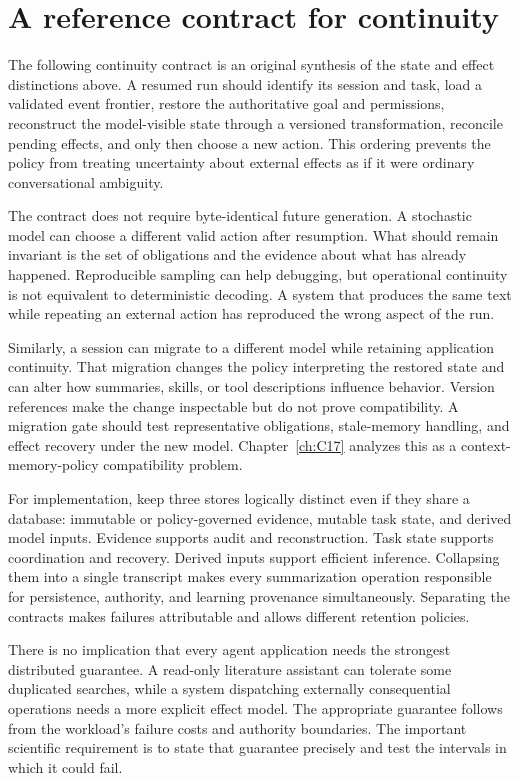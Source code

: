 \section{A reference contract for continuity}\label{sec:C13:contract}
The following continuity contract is an original synthesis of the state and effect distinctions above. A resumed run should identify its session and task, load a validated event frontier, restore the authoritative goal and permissions, reconstruct the model-visible state through a versioned transformation, reconcile pending effects, and only then choose a new action. This ordering prevents the policy from treating uncertainty about external effects as if it were ordinary conversational ambiguity.

The contract does not require byte-identical future generation. A stochastic model can choose a different valid action after resumption. What should remain invariant is the set of obligations and the evidence about what has already happened. Reproducible sampling can help debugging, but operational continuity is not equivalent to deterministic decoding. A system that produces the same text while repeating an external action has reproduced the wrong aspect of the run.

Similarly, a session can migrate to a different model while retaining application continuity. That migration changes the policy interpreting the restored state and can alter how summaries, skills, or tool descriptions influence behavior. Version references make the change inspectable but do not prove compatibility. A migration gate should test representative obligations, stale-memory handling, and effect recovery under the new model. Chapter~\ref{ch:C17} analyzes this as a context-memory-policy compatibility problem.

For implementation, keep three stores logically distinct even if they share a database: immutable or policy-governed evidence, mutable task state, and derived model inputs. Evidence supports audit and reconstruction. Task state supports coordination and recovery. Derived inputs support efficient inference. Collapsing them into a single transcript makes every summarization operation responsible for persistence, authority, and learning provenance simultaneously. Separating the contracts makes failures attributable and allows different retention policies.

There is no implication that every agent application needs the strongest distributed guarantee. A read-only literature assistant can tolerate some duplicated searches, while a system dispatching externally consequential operations needs a more explicit effect model. The appropriate guarantee follows from the workload's failure costs and authority boundaries. The important scientific requirement is to state that guarantee precisely and test the intervals in which it could fail.

